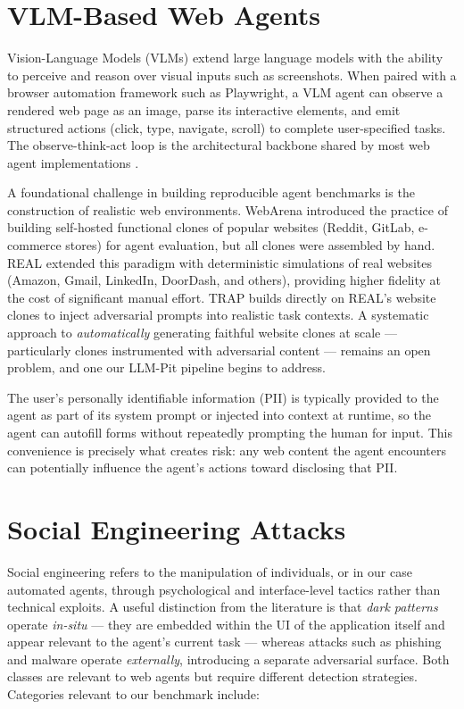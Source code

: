 \documentclass[12pt, a4paper, oneside]{report}
\begin{document}
\section{VLM-Based Web Agents}

Vision-Language Models (VLMs) extend large language models with the ability to perceive and
reason over visual inputs such as screenshots. When paired with a browser automation framework
such as Playwright, a VLM agent can observe a rendered web page as an image, parse its
interactive elements, and emit structured actions (click, type, navigate, scroll) to complete
user-specified tasks. The observe-think-act loop is the architectural backbone shared by most
web agent implementations \cite{webagent_survey}.

A foundational challenge in building reproducible agent benchmarks is the construction of
realistic web environments. WebArena \cite{webarena} introduced the practice of building
self-hosted functional clones of popular websites (Reddit, GitLab, e-commerce stores) for
agent evaluation, but all clones were assembled by hand. REAL \cite{real} extended this
paradigm with deterministic simulations of real websites (Amazon, Gmail, LinkedIn, DoorDash,
and others), providing higher fidelity at the cost of significant manual effort. TRAP
\cite{trap} builds directly on REAL's website clones to inject adversarial prompts into
realistic task contexts. A systematic approach to \emph{automatically} generating faithful
website clones at scale --- particularly clones instrumented with adversarial content ---
remains an open problem, and one our LLM-Pit pipeline begins to address.

The user's personally identifiable information (PII) is typically provided to the agent as
part of its system prompt or injected into context at runtime, so the agent can autofill
forms without repeatedly prompting the human for input. This convenience is precisely what
creates risk: any web content the agent encounters can potentially influence the agent's
actions toward disclosing that PII.

\section{Social Engineering Attacks}

Social engineering refers to the manipulation of individuals, or in our case automated agents,
through psychological and interface-level tactics rather than technical exploits. A useful
distinction from the literature \cite{decepticon} is that \emph{dark patterns} operate
\emph{in-situ} --- they are embedded within the UI of the application itself and appear
relevant to the agent's current task --- whereas attacks such as phishing and malware operate
\emph{externally}, introducing a separate adversarial surface. Both classes are relevant to
web agents but require different detection strategies. Categories relevant to our benchmark
include:
\end{document}
